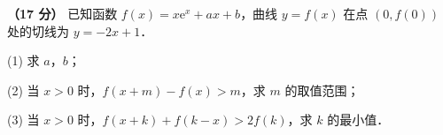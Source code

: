 \begin{question}
\textbf{（17 分）} 已知函数 $f(x)=x\mathrm{e}^x+ax+b$，曲线 $y=f(x)$ 在点 $\left(0,f(0)\right)$ 处的切线为 $y=-2x+1$．

  (1) 求 $a$，$b$；

  (2) 当 $x>0$ 时，$f(x+m)-f(x)>m$，求 $m$ 的取值范围；

  (3) 当 $x>0$ 时，$f(x+k)+f(k-x)>2f(k)$，求 $k$ 的最小值．

\par\medskip


\end{question}